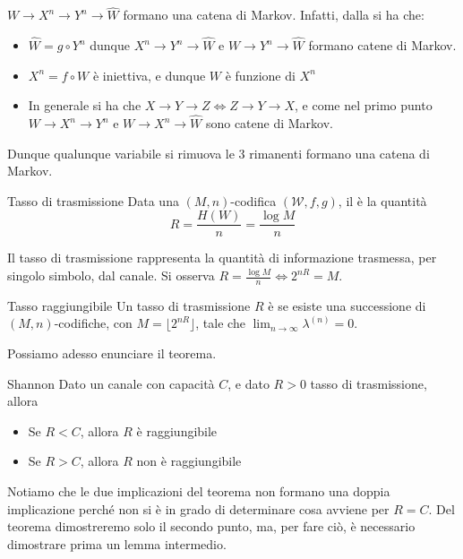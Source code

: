 \begin{observation}{}
  \(W \to X^n \to Y^n \to \hat{W}\) formano una catena di Markov.
  Infatti, dalla  si ha che:
  \begin{itemize}
    \item \(\hat{W} = g \circ Y^n\) dunque \(X^n \to Y^n \to \hat{W}\) e \(W \to Y^n \to \hat{W}\) formano catene di Markov.
    \item \(X^n = f \circ W\) è iniettiva, e dunque \(W\) è funzione di \(X^n\)
    \item In generale si ha che \(X\to Y\to Z \iff Z \to Y \to X\), e come nel primo punto \(W \to X^n \to Y^n\) e \(W \to X^n \to \hat{W}\) sono catene di Markov.
  \end{itemize}
  Dunque qualunque variabile si rimuova le \(3\) rimanenti formano una catena di Markov.
\end{observation}

\begin{definition}{Tasso di trasmissione}
  Data una \((M,n)\)-codifica \((\mathcal{W},f,g)\), il  è la quantità
  \[R = \frac{H(W)}{n} = \frac{\log M}{n}\] 
\end{definition}

Il tasso di trasmissione rappresenta la quantità di informazione trasmessa, per singolo simbolo, dal canale. Si osserva \(R = \frac{\log M}{n} \iff 2^{nR} = M\).

\begin{definition}{Tasso raggiungibile}
  Un tasso di trasmissione \(R\) è  se esiste una successione di \((M, n)\)-codifiche, con $M=\lfloor 2^{nR} \rfloor$, tale che \(\lim_{n\to\infty} \lambda^{(n)} = 0\).
\end{definition}

Possiamo adesso enunciare il teorema.

\begin{theorem}[label={thm:shannon_2}]{Shannon}
  Dato un canale con capacità \(C\), e dato \(R>0\) tasso di trasmissione, allora
  \begin{itemize}
    \item Se \(R < C\), allora \(R\) è raggiungibile
    \item Se \(R > C\), allora \(R\) non è raggiungibile
  \end{itemize}
\end{theorem}

Notiamo che le due implicazioni del teorema non formano una doppia implicazione perché non si è in grado di determinare cosa avviene per \(R = C\).
Del teorema dimostreremo solo il secondo punto, ma, per fare ciò, è necessario dimostrare prima un lemma intermedio.

